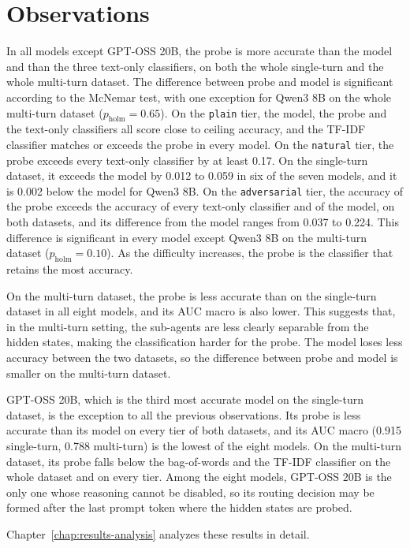 \section{Observations}
\label{sec:ch7-observations}

In all models except GPT-OSS 20B, the probe is more accurate than the model and than the three text-only classifiers, on both the whole single-turn and the whole multi-turn dataset. The difference between probe and model is significant according to the McNemar test, with one exception for Qwen3 8B on the whole multi-turn dataset ($p_{\text{holm}} = 0.65$). On the \texttt{plain} tier, the model, the probe and the text-only classifiers all score close to ceiling accuracy, and the TF-IDF classifier matches or exceeds the probe in every model. On the \texttt{natural} tier, the probe exceeds every text-only classifier by at least 0.17. On the single-turn dataset, it exceeds the model by 0.012 to 0.059 in six of the seven models, and it is 0.002 below the model for Qwen3 8B. On the \texttt{adversarial} tier, the accuracy of the probe exceeds the accuracy of every text-only classifier and of the model, on both datasets, and its difference from the model ranges from 0.037 to 0.224. This difference is significant in every model except Qwen3 8B on the multi-turn dataset ($p_{\text{holm}} = 0.10$). As the difficulty increases, the probe is the classifier that retains the most accuracy.

On the multi-turn dataset, the probe is less accurate than on the single-turn dataset in all eight models, and its AUC macro is also lower. This suggests that, in the multi-turn setting, the sub-agents are less clearly separable from the hidden states, making the classification harder for the probe. The model loses less accuracy between the two datasets, so the difference between probe and model is smaller on the multi-turn dataset.

GPT-OSS 20B, which is the third most accurate model on the single-turn dataset, is the exception to all the previous observations. Its probe is less accurate than its model on every tier of both datasets, and its AUC macro (0.915 single-turn, 0.788 multi-turn) is the lowest of the eight models. On the multi-turn dataset, its probe falls below the bag-of-words and the TF-IDF classifier on the whole dataset and on every tier. Among the eight models, GPT-OSS 20B is the only one whose reasoning cannot be disabled, so its routing decision may be formed after the last prompt token where the hidden states are probed.

Chapter~\ref{chap:results-analysis} analyzes these results in detail.
